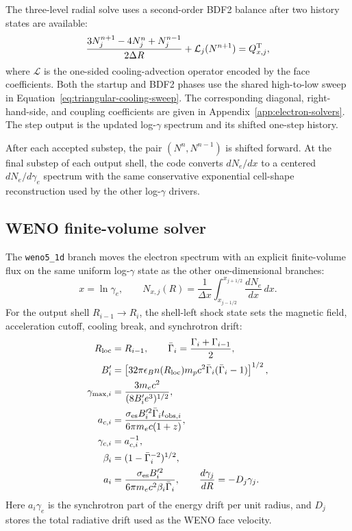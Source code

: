 \documentclass[twocolumn]{aastex702}
\begin{document}
The three-level radial solve uses a second-order BDF2 balance after two history
states are available:
\begin{equation}
\frac{3N_j^{n+1}-4N_j^n+N_j^{n-1}}{2\Delta R}
+\mathcal{L}_j(N^{n+1})=Q_{x,j}^{\rm T},
\end{equation}
where \(\mathcal{L}\) is the one-sided cooling-advection operator encoded by the
face coefficients.  Both the startup and BDF2 phases use the shared high-to-low
sweep in Equation~\eqref{eq:triangular-cooling-sweep}.  The corresponding
diagonal, right-hand-side, and coupling coefficients are given in
Appendix~\ref{app:electron-solvers}.  The step output is the updated
log-\(\gamma\) spectrum and its shifted one-step history.

After each accepted substep, the pair \((N^n,N^{n-1})\) is shifted forward.  At
the final substep of each output shell, the code converts \(dN_e/dx\) to a
centered \(dN_e/d\gamma_e\) spectrum with the same conservative exponential
cell-shape reconstruction used by the other log-\(\gamma\) drivers.

\subsection{WENO finite-volume solver}

The \texttt{weno5\_1d} branch moves the electron spectrum with an explicit
finite-volume flux on the same uniform log-\(\gamma\) state as the other
one-dimensional branches:
\begin{equation}
x=\ln\gamma_e,\qquad
N_{x,j}(R)=\frac{1}{\Delta x}
\int_{x_{j-1/2}}^{x_{j+1/2}}\frac{dN_e}{dx}\,dx .
\end{equation}
For the output shell \(R_{i-1}\rightarrow R_i\), the shell-left shock state sets
the magnetic field, acceleration cutoff, cooling break, and synchrotron drift:
\begin{equation}
\begin{aligned}
R_{\rm loc}&=R_{i-1},\qquad
\bar\Gamma_i=\frac{\Gamma_i+\Gamma_{i-1}}{2},\\
B'_i&=\left[32\pi\epsilon_B n(R_{\rm loc})m_pc^2
\bar\Gamma_i(\bar\Gamma_i-1)\right]^{1/2},\\
\gamma_{\max,i}&=\frac{3m_ec^2}{(8B'_ie^3)^{1/2}},\\
a_{c,i}&=\frac{\sigma_{\rm es}B_i'^2\bar\Gamma_i t_{{\rm obs},i}}
{6\pi m_ec(1+z)},\\
\gamma_{c,i}&=a_{c,i}^{-1},\\
\beta_i&=(1-\bar\Gamma_i^{-2})^{1/2},\\
a_i&=\frac{\sigma_{\rm es}B_i'^2}
{6\pi m_ec^2\beta_i\bar\Gamma_i},\qquad
\frac{d\gamma_j}{dR}=-D_j\gamma_j .
\end{aligned}
\end{equation}
Here \(a_i\gamma_e\) is the synchrotron part of the energy drift per unit radius,
and \(D_j\) stores the total radiative drift used as the WENO face velocity.
\end{document}
